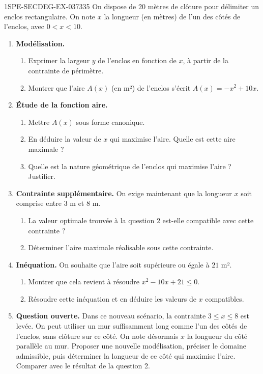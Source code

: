 \begin{exercice}{1SPE-SECDEG-EX-037}{3}{35}
On dispose de $20$ mètres de clôture pour délimiter un enclos rectangulaire. On note $x$ la longueur (en mètres) de l'un des côtés de l'enclos, avec $0 < x < 10$.

\begin{enumerate}
  \item \textbf{Modélisation.}
  \begin{enumerate}
    \item Exprimer la largeur $y$ de l'enclos en fonction de $x$, à partir de la contrainte de périmètre.
    \item Montrer que l'aire $A(x)$ (en m²) de l'enclos s'écrit $A(x) = -x^2 + 10x$.
  \end{enumerate}

  \item \textbf{Étude de la fonction aire.}
  \begin{enumerate}
    \item Mettre $A(x)$ sous forme canonique.
    \item En déduire la valeur de $x$ qui maximise l'aire. Quelle est cette aire maximale ?
    \item Quelle est la nature géométrique de l'enclos qui maximise l'aire ? Justifier.
  \end{enumerate}

  \item \textbf{Contrainte supplémentaire.} On exige maintenant que la longueur $x$ soit comprise entre $3$ m et $8$ m.
  \begin{enumerate}
    \item La valeur optimale trouvée à la question 2 est-elle compatible avec cette contrainte ?
    \item Déterminer l'aire maximale réalisable sous cette contrainte.
  \end{enumerate}

  \item \textbf{Inéquation.} On souhaite que l'aire soit supérieure ou égale à $21$ m².
  \begin{enumerate}
    \item Montrer que cela revient à résoudre $x^2 - 10x + 21 \leq 0$.
    \item Résoudre cette inéquation et en déduire les valeurs de $x$ compatibles.
  \end{enumerate}

  \item \textbf{Question ouverte.} Dans ce nouveau scénario, la contrainte
  $3\leq x\leq8$ est levée. On peut utiliser un mur suffisamment long comme
  l'un des côtés de l'enclos, sans clôture sur ce côté. On note désormais $x$
  la longueur du côté parallèle au mur. Proposer une nouvelle modélisation,
  préciser le domaine admissible, puis déterminer la longueur de ce côté
  qui maximise l'aire. Comparer avec le résultat de la question 2.
\end{enumerate}
\end{exercice}

